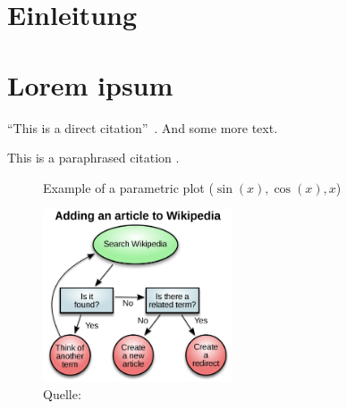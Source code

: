 \documentclass{hwz}
\begin{document}


\newpage

\tableofcontents

\newpage


\newpage


\newpage


\makeBeginMain
\section{Einleitung}

\lipsum[2]

\newpage

\section{Lorem ipsum}

\lipsum[2]

\enquote{This is a direct citation}~\autocite{Nadeau2007AClassification}. And some more text.

This is a paraphrased citation \autocite{Nadeau2007AClassification}.

\lipsum[1]

\begin{figure}[h]
\caption{Example of a parametric plot ($\sin (x), \cos(x), x$)}
\centering
\includegraphics[width=0.5\textwidth]{graphics/wikipedia.png}
\caption*{Quelle: \textcite{BundesamtfurStatistik2018Finanzierung}}
\end{figure}
\end{document}
